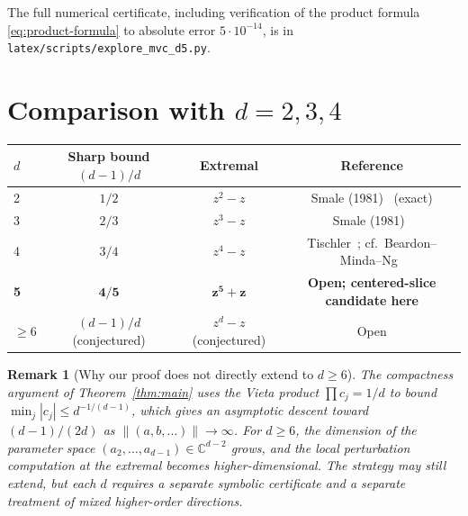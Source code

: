 \documentclass[11pt,a4paper]{article}
\newtheorem{remark}[theorem]{Remark}
\begin{document}
The full numerical certificate, including verification of the product formula \eqref{eq:product-formula} to absolute error $5 \cdot 10^{-14}$, is in \verb|latex/scripts/explore_mvc_d5.py|.

\section{Comparison with $d = 2, 3, 4$}

\begin{center}
\begin{tabular}{lccc}
\toprule
$d$ & Sharp bound $(d - 1)/d$ & Extremal & Reference \\
\midrule
2 & $1/2$ & $z^2 - z$ & Smale (1981)~\cite{smale1981} (exact) \\
3 & $2/3$ & $z^3 - z$ & Smale (1981)~\cite{smale1981} \\
4 & $3/4$ & $z^4 - z$ & Tischler~\cite{tischler}; cf.\ Beardon--Minda--Ng~\cite{beardon} \\
\textbf{5} & $\boldsymbol{4/5}$ & $\boldsymbol{z^5 + z}$ & \textbf{Open; centered-slice candidate here} \\
\midrule
$\ge 6$ & $(d-1)/d$ (conjectured) & $z^d - z$ (conjectured) & Open \\
\bottomrule
\end{tabular}
\end{center}

\begin{remark}[Why our proof does not directly extend to $d \ge 6$]
The compactness argument of Theorem~\ref{thm:main} uses the Vieta product $\prod c_j = 1/d$ to bound $\min_j |c_j| \le d^{-1/(d-1)}$, which gives an asymptotic descent toward $(d-1)/(2d)$ as $\|(a, b, \dots)\| \to \infty$. For $d \ge 6$, the dimension of the parameter space $(a_2, \dots, a_{d-1}) \in \mathbb{C}^{d-2}$ grows, and the local perturbation computation at the extremal becomes higher-dimensional. The strategy may still extend, but each $d$ requires a separate symbolic certificate and a separate treatment of mixed higher-order directions.
\end{remark}
\end{document}
